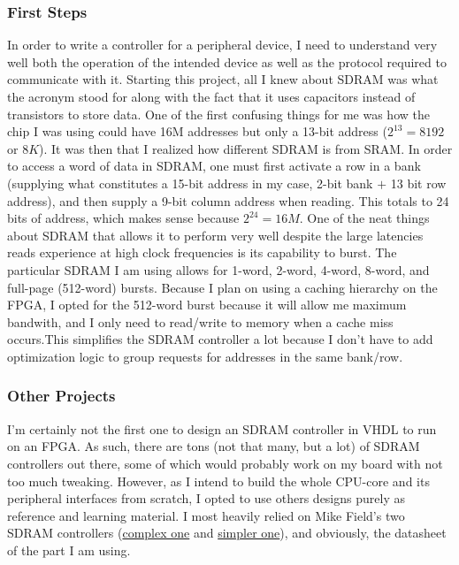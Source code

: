 \documentclass{article}
\begin{document}
\subsubsection{First Steps}
In order to write a controller for a peripheral device, I need to understand very well both the operation of the intended device as well as the protocol required to communicate with it. Starting this project, all I knew about SDRAM was what the acronym stood for along with the fact that it uses capacitors instead of transistors to store data. One of the first confusing things for me was how the chip I was using could have 16M addresses but only a 13-bit address ($2^{13} = 8192$ or $8K$). It was then that I realized how different SDRAM is from SRAM. In order to access a word of data in SDRAM, one must first activate a row in a bank (supplying what constitutes a 15-bit address in my case, 2-bit bank $+$ 13 bit row address), and then supply a 9-bit column address when reading. This totals to 24 bits of address, which makes sense because $2^{24} = 16M$. One of the neat things about SDRAM that allows it to perform very well despite the large latencies reads experience at high clock frequencies is its capability to burst. The particular SDRAM I am using allows for 1-word, 2-word, 4-word, 8-word, and full-page (512-word) bursts. Because I plan on using a caching hierarchy on the FPGA, I opted for the 512-word burst because it will allow me maximum bandwith, and I only need to read/write to memory when a cache miss occurs.This simplifies the SDRAM controller a lot because I don't have to add optimization logic to group requests for addresses in the same bank/row.

\subsubsection{Other Projects}
I'm certainly not the first one to design an SDRAM controller in VHDL to run on an FPGA. As such, there are tons (not that many, but a lot) of SDRAM controllers out there, some of which would probably work on my board with not too much tweaking. However, as I intend to build the whole CPU-core and its peripheral interfaces from scratch, I opted to use others designs purely as reference and learning material. I most heavily relied on Mike Field's two SDRAM controllers (\href{http://hamsterworks.co.nz/mediawiki/index.php/SDRAM_Memory_Controller}{complex one} and \href{http://hamsterworks.co.nz/mediawiki/index.php/Simple_SDRAM_Controller}{simpler one}), and obviously, the datasheet of the part I am using.
\end{document}
